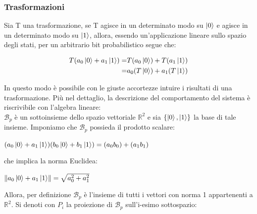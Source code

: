\documentclass[12pt,a4paper,openright]{report}
\newcommand{\norm}[1]{\left\lVert#1\right\rVert}
\begin{document}
\subsubsection{Trasformazioni}
Sia T una trasformazione, se T agisce in un determinato modo su $\ket0$
e agisce in un determinato modo su $\ket1$, allora, essendo un'applicazione lineare sullo spazio degli stati, per un arbitrario bit probabilistico segue che:
\begin{center}
    \begin{align*}
        T(a_0\ket0 + a_1\ket1)=& T(a_0\ket0) + T(a_1\ket1)\\ =& a_0(T\ket0) + a_1(T\ket1)
    \end{align*}
\end{center}
In questo modo è possibile con le giuste accortezze intuire i risultati di una trasformazione. Più nel dettaglio, la descrizione 
del comportamento del sistema è riscrivibile con l'algebra lineare:\\
$\mathcal{B}_p$ è un sottoinsieme dello spazio vettoriale ${\mathbb{R}^2}$ e sia $\{\ket0,\ket1 \}$ la base di tale insieme. Imponiamo che $\mathcal{B}_p$
possieda il prodotto scalare:
\begin{center}
    $(a_0\ket0 + a_1\ket1)(b_0\ket0 + b_1\ket1) = (a_0b_0) + (a_1b_1)$
\end{center}
che implica la norma Euclidea:
\begin{center}
    $\norm{a_0\ket0 + a_1\ket1}=\sqrt{a_0^2+a_1^2}$
\end{center}
Allora, per definizione $\mathcal{B}_p$ è l'insieme di tutti i vettori con norma 1 appartenenti a ${\mathbb{R}^2}$. Si denoti con $P_i$ la proiezione
di $\mathcal{B}_p$ sull'i-esimo sottospazio:
    
\end{document}
